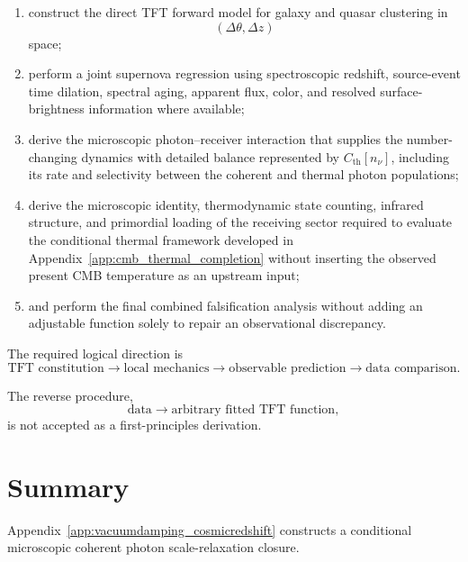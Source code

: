 \begin{enumerate}
    \item construct the direct TFT forward model for galaxy and quasar
    clustering in
    \begin{equation}
        (\Delta\theta,\Delta z)
    \end{equation}
    space;

    \item perform a joint supernova regression using spectroscopic redshift,
    source-event time dilation, spectral aging, apparent flux, color, and
    resolved surface-brightness information where available;

    \item derive the microscopic photon--receiver interaction that supplies
    the number-changing dynamics with detailed balance represented by
    \(C_{\mathrm{th}}[n_\nu]\), including its rate and selectivity between the
    coherent and thermal photon populations;

    \item derive the microscopic identity, thermodynamic state counting,
    infrared structure, and primordial loading of the receiving sector
    required to evaluate the conditional thermal framework developed in
    Appendix~\ref{app:cmb_thermal_completion} without inserting the observed
    present CMB temperature as an upstream input;

    \item and perform the final combined falsification analysis without adding
    an adjustable function solely to repair an observational discrepancy.
\end{enumerate}

The required logical direction is
\begin{equation}
    \text{TFT constitution}
    \rightarrow
    \text{local mechanics}
    \rightarrow
    \text{observable prediction}
    \rightarrow
    \text{data comparison}.
    \label{eq:AR_final_logic}
\end{equation}

The reverse procedure,
\begin{equation}
    \text{data}
    \rightarrow
    \text{arbitrary fitted TFT function},
\end{equation}
is not accepted as a first-principles derivation.


\section{Summary}

Appendix~\ref{app:vacuumdamping_cosmicredshift}
constructs a conditional microscopic coherent photon scale-relaxation
closure.

